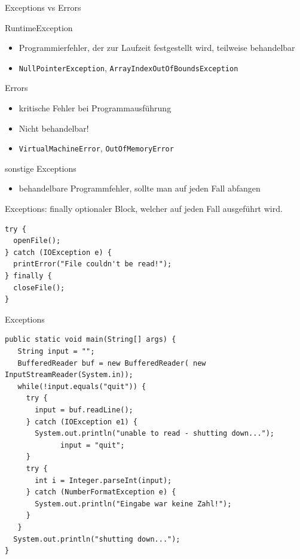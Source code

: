 \documentclass[18pt]{beamer}
\begin{document}
\begin{frame}[fragile]{Exceptions vs Errors}
	\begin{block}{RuntimeException}
    \begin{itemize}
      \item Programmierfehler, der zur Laufzeit festgestellt wird, teilweise behandelbar
      \item \lstinline$NullPointerException$, \lstinline$ArrayIndexOutOfBoundsException$
    \end{itemize}
  \end{block}
  \begin{block}{Errors}
    \begin{itemize}
      \item kritische Fehler bei Programmausführung
      \item Nicht behandelbar!
      \item \lstinline$VirtualMachineError$, \lstinline$OutOfMemoryError$
    \end{itemize}
  \end{block}
  \begin{block}{sonstige Exceptions}
    \begin{itemize}
      \item behandelbare Programmfehler, sollte man auf jeden Fall abfangen
    \end{itemize}
  \end{block}
\end{frame}

\begin{frame}[fragile]{Exceptions: finally}
  optionaler Block, welcher auf jeden Fall ausgeführt wird.
	\begin{lstlisting}
try {
  openFile();
} catch (IOException e) {
  printError("File couldn't be read!");
} finally {
  closeFile();
}
  \end{lstlisting}
\end{frame}


\begin{frame}[fragile]{Exceptions}
\begin{lstlisting}
public static void main(String[] args) {
   String input = "";
   BufferedReader buf = new BufferedReader( new InputStreamReader(System.in));
   while(!input.equals("quit")) {  
     try {
       input = buf.readLine();
     } catch (IOException e1) {
       System.out.println("unable to read - shutting down...");
			 input = "quit";
     }
     try {
       int i = Integer.parseInt(input);
     } catch (NumberFormatException e) {
       System.out.println("Eingabe war keine Zahl!");
     }
   }
  System.out.println("shutting down...");
}\end{lstlisting}
\end{frame}
\end{document}
